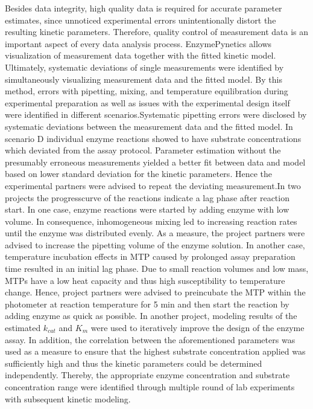 \documentclass[letterpaper,12pt,english]{jupyterBook}
\begin{document}
\sphinxAtStartPar
Besides data integrity, high quality data is required for accurate parameter estimates, since unnoticed experimental errors unintentionally distort the resulting kinetic parameters. Therefore, quality control of measurement data is an important aspect of every data analysis process. EnzymePynetics allows visualization of measurement data together with the fitted kinetic model. Ultimately, systematic deviations of single measurements were identified by simultaneously visualizing measurement data and the fitted model.
By this method, errors with pipetting, mixing, and temperature equilibration during experimental preparation as well as issues with the experimental design itself were identified in different scenarios.Systematic pipetting errors were disclosed by systematic deviations between the measurement data and the fitted model.
In scenario D individual enzyme reactions showed to have substrate concentrations which deviated from the assay protocol. Parameter estimation without the presumably erroneous measurements yielded a better fit between data and model based on lower standard deviation for the kinetic parameters. Hence the experimental partners were advised to repeat the deviating measurement.In two projects the progress\sphinxhyphen{}curve of the reactions indicate a lag phase after reaction start. In one case, enzyme reactions were started by adding enzyme with low volume. In consequence, inhomogeneous mixing led to increasing reaction rates until the enzyme was distributed evenly. As a measure, the project partners were advised to increase the pipetting volume of the enzyme solution.
In another case, temperature incubation effects in MTP caused by prolonged assay preparation time resulted in an initial lag phase. Due to small reaction volumes and low mass, MTPs have a low heat capacity and thus high susceptibility to temperature change. Hence, project partners were advised to pre\sphinxhyphen{}incubate the MTP within the photometer at reaction temperature for 5 min and then start the reaction by adding enzyme as quick as possible.
In another project, modeling results of the estimated \(k_{cat}\) and \(K_{m}\) were used to iteratively improve the design of the enzyme assay. In addition, the correlation between the aforementioned parameters was used as a measure to ensure that the highest substrate concentration applied was sufficiently high and thus the kinetic parameters could be determined independently.
Thereby, the appropriate enzyme concentration and substrate concentration range were identified through multiple round of lab experiments with subsequent kinetic modeling.
\end{document}
